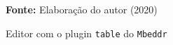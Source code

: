 \begin{figure}[ht!]
\centering

\caption{\textmd{Editor com o plugin \texttt{table} do \texttt{Mbeddr}}}
\label{fig:tableeditor}

\par\medskip\textbf{Fonte:} Elaboração do autor (2020) \par\medskip

\end{figure}

